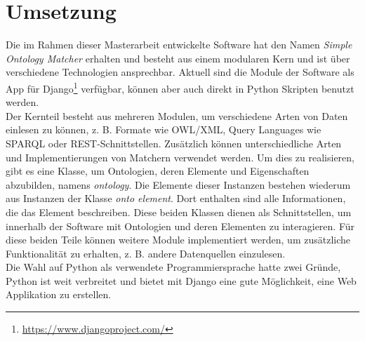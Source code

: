%
\chapter{Umsetzung}
\label{chap:implementation}
		
		Die im Rahmen dieser Masterarbeit entwickelte Software hat den Namen
		\textit{Simple Ontology Matcher} erhalten und besteht aus einem modularen Kern
		und ist über verschiedene Technologien ansprechbar. Aktuell sind die Module
		der Software als App für Django\footnote{\url{https://www.djangoproject.com/}} verfügbar, können
		aber auch direkt in Python Skripten benutzt werden.\\
		Der Kernteil besteht aus mehreren Modulen, um verschiedene Arten von
		Daten einlesen zu können, z. B.
		Formate wie OWL/XML, Query Languages wie SPARQL oder REST-Schnittstellen.
		Zusätzlich können unterschiedliche Arten und Implementierungen von Matchern
		verwendet werden. Um dies zu realisieren, gibt es eine Klasse, um Ontologien,
		deren Elemente und Eigenschaften abzubilden, namens \textit{ontology}.
		Die Elemente dieser Instanzen bestehen wiederum aus Instanzen der Klasse
		\textit{onto element}. Dort enthalten sind alle Informationen, die das Element
		beschreiben. Diese beiden Klassen dienen als Schnittstellen, um innerhalb der
		Software mit Ontologien und deren Elementen zu interagieren. Für diese beiden
		Teile können weitere Module implementiert werden, um zusätzliche
		Funktionalität zu erhalten, z. B. andere Datenquellen einzulesen.\\
		Die Wahl auf Python als verwendete Programmiersprache hatte zwei Gründe,
		Python ist weit verbreitet und bietet mit Django eine gute Möglichkeit, eine
		Web Applikation zu erstellen.
		
